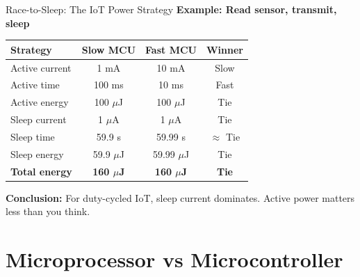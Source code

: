 \documentclass[aspectratio=169,11pt]{beamer}
\begin{document}
\begin{frame}{Race-to-Sleep: The IoT Power Strategy}
    \textbf{Example: Read sensor, transmit, sleep}
    
    \vspace{0.3cm}
    \begin{table}
        \centering
        \small
        \begin{tabular}{@{}lccc@{}}
            \toprule
            \textbf{Strategy} & \textbf{Slow MCU} & \textbf{Fast MCU} & \textbf{Winner} \\
            \midrule
            Active current & 1 mA & 10 mA & Slow \\
            Active time & 100 ms & 10 ms & Fast \\
            Active energy & 100 $\mu$J & 100 $\mu$J & Tie \\
            Sleep current & 1 $\mu$A & 1 $\mu$A & Tie \\
            Sleep time & 59.9 s & 59.99 s & $\approx$ Tie \\
            Sleep energy & 59.9 $\mu$J & 59.99 $\mu$J & Tie \\
            \textbf{Total energy} & \textbf{160 $\mu$J} & \textbf{160 $\mu$J} & \textbf{Tie} \\
            \bottomrule
        \end{tabular}
    \end{table}
    
    \vspace{0.3cm}
    \textbf{Conclusion:} For duty-cycled IoT, sleep current dominates. Active power matters less than you think.
\end{frame}

\section{Microprocessor vs Microcontroller}
\end{document}
